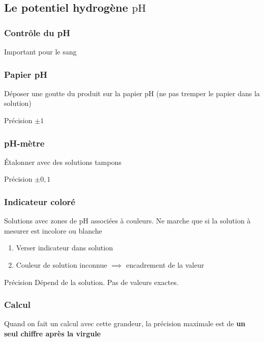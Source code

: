 \documentclass{article}
\newenvironment{definitions}{\begin{description}[leftmargin=!,labelwidth=\widthof{\bfseries Lorem ipsum dolor}]}{\end{description}}
\begin{document}
\subsection{Le potentiel hydrogène $\text{pH}$}

\subsubsection{Contrôle du pH}
Important pour le sang

\subsubsection{Papier pH}
Déposer une goutte du produit sur la papier pH (ne pas tremper le papier dans la solution)
\begin{definitions}
\item[Précision] $\pm 1$
\end{definitions}

\subsubsection{pH-mètre}
Étalonner avec des solutions tampons
\begin{definitions}
\item[Précision] $\pm 0,1$
\end{definitions}

\subsubsection{Indicateur coloré}
Solutions avec zones de pH associées à couleurs. Ne marche que si la solution à mesurer est incolore ou blanche
\begin{enumerate}
    \item Verser indicateur dans solution
    \item Couleur de solution inconnue $\implies$ encadrement de la valeur
\end{enumerate}
\begin{definitions}
\item[Précision] Dépend de la solution. Pas de valeurs exactes.
\end{definitions}

\subsubsection{Calcul}

Quand on fait un calcul avec cette grandeur, la précision maximale est de \textbf{un seul chiffre après la virgule}
\vspace{5pt}
\end{document}
